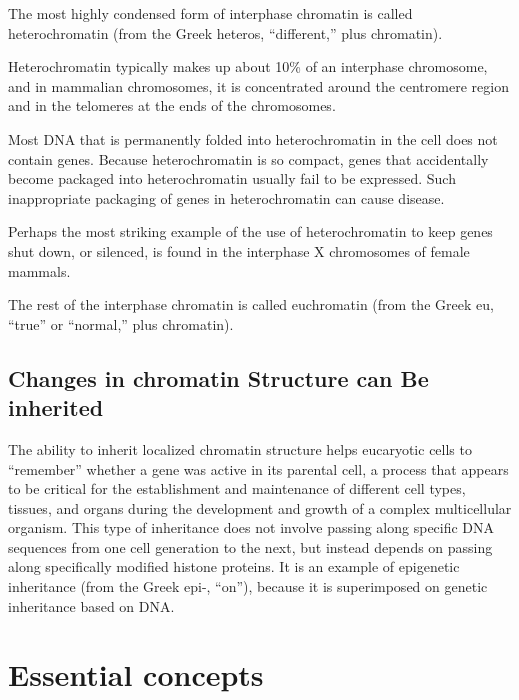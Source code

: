 The most highly condensed form of interphase chromatin is called heterochromatin
(from the Greek heteros, “different,” plus chromatin).

Heterochromatin typically makes up about 10\% of an interphase chromosome, and in mammalian
chromosomes, it is concentrated around the centromere region
and in the telomeres at the ends of the chromosomes.

Most DNA that is permanently folded into heterochromatin in the cell
does not contain genes. Because heterochromatin is so compact, genes
that accidentally become packaged into heterochromatin usually fail to
be expressed. Such inappropriate packaging of genes in
heterochromatin can cause disease.

Perhaps the most striking example of the use of heterochromatin to keep
genes shut down, or silenced, is found in the interphase X chromosomes of
female mammals.

The rest of the interphase chromatin is called euchromatin (from the
Greek eu, “true” or “normal,” plus chromatin).

\subsection{Changes in chromatin Structure can Be inherited}

The ability to inherit localized chromatin structure helps eucaryotic cells
to “remember” whether a gene was active in its parental cell, a process
that appears to be critical for the establishment and maintenance of different
cell types, tissues, and organs during the development and growth
of a complex multicellular organism. This type of inheritance does not
involve passing along specific DNA sequences from one cell generation to
the next, but instead depends on passing along specifically modified histone
proteins. It is an example of epigenetic inheritance (from the Greek
epi-, “on”), because it is superimposed on genetic inheritance based on
DNA.

\section{Essential concepts}

